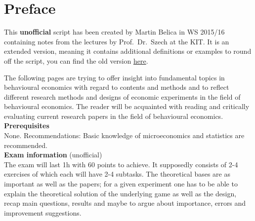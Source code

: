 

\chapter*{Preface}
This \textbf{unofficial} script has been created by Martin Belica in WS 2015/16 containing notes from the lectures by Prof.~Dr.~Szech at the KIT. It is an extended version, meaning it contains additional definitions or examples to round off the script, you can find the old version \href{http://goo.gl/EOC2Kh}{here}.

The following pages are trying to offer insight into fundamental topics in behavioural economics with regard to contents and methods and to reflect different research methods and designs of economic experiments in the field of behavioural economics. The reader will be acquainted with reading and critically evaluating current research papers in the field of behavioural economics. \\

\textbf{Prerequisites} \\
None. Recommendations: Basic knowledge of microeconomics and statistics are recommended. \\

\textbf{Exam information} (unofficial) \\
The exam will last 1h with 60 points to achieve. It supposedly consists of 2-4 exercises of which each will have 2-4 subtasks. The theoretical bases are as important as well as the papers; for a given experiment one has to be able to explain the theoretical solution of the underlying game as well as the design, recap main questions, results and maybe to argue about importance, errors and improvement suggestions.